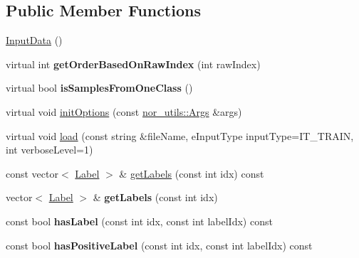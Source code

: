\subsection*{Public Member Functions}
\begin{DoxyCompactItemize}
\item 
\hyperlink{classMultiBoost_1_1InputData_a98a5fea89a121fbc3a5a1727b5e3a4de}{Input\-Data} ()
\item 
\hypertarget{classMultiBoost_1_1InputData_aa4ea74f2c82341dac7caa7dc003b2010}{virtual int {\bfseries get\-Order\-Based\-On\-Raw\-Index} (int raw\-Index)}\label{classMultiBoost_1_1InputData_aa4ea74f2c82341dac7caa7dc003b2010}

\item 
\hypertarget{classMultiBoost_1_1InputData_a3ac4dab9bd669a63b7d32eb3fd315ae6}{virtual bool {\bfseries is\-Samples\-From\-One\-Class} ()}\label{classMultiBoost_1_1InputData_a3ac4dab9bd669a63b7d32eb3fd315ae6}

\item 
virtual void \hyperlink{classMultiBoost_1_1InputData_a2fb71a41b408568bf3f64dad6e457c34}{init\-Options} (const \hyperlink{classnor__utils_1_1Args}{nor\-\_\-utils\-::\-Args} \&args)
\item 
virtual void \hyperlink{classMultiBoost_1_1InputData_abf6290345aa3ffc9f81af71c41487390}{load} (const string \&file\-Name, e\-Input\-Type input\-Type=I\-T\-\_\-\-T\-R\-A\-I\-N, int verbose\-Level=1)
\item 
const vector$<$ \hyperlink{structMultiBoost_1_1Label}{Label} $>$ \& \hyperlink{classMultiBoost_1_1InputData_a0a1038757e7120197aab365e5c031b22}{get\-Labels} (const int idx) const 
\item 
\hypertarget{classMultiBoost_1_1InputData_a4ec7b1d8075c8e132393e716bdb12684}{vector$<$ \hyperlink{structMultiBoost_1_1Label}{Label} $>$ \& {\bfseries get\-Labels} (const int idx)}\label{classMultiBoost_1_1InputData_a4ec7b1d8075c8e132393e716bdb12684}

\item 
\hypertarget{classMultiBoost_1_1InputData_af5a2f8877cfa3928b814b0016025dac4}{const bool {\bfseries has\-Label} (const int idx, const int label\-Idx) const }\label{classMultiBoost_1_1InputData_af5a2f8877cfa3928b814b0016025dac4}

\item 
\hypertarget{classMultiBoost_1_1InputData_a6fd2dc4fd0187c3fa886348fbbe210e9}{const bool {\bfseries has\-Positive\-Label} (const int idx, const int label\-Idx) const }\label{classMultiBoost_1_1InputData_a6fd2dc4fd0187c3fa886348fbbe210e9}


\end{DoxyCompactItemize}
